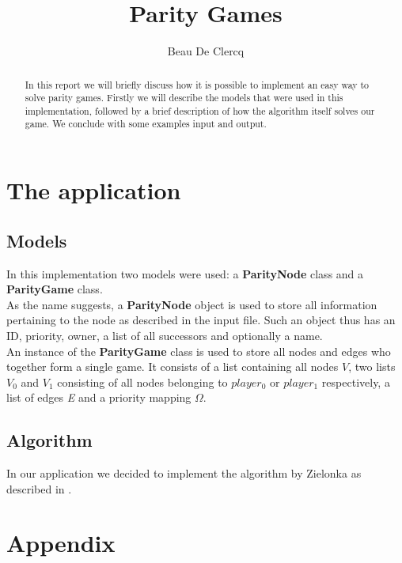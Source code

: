 \documentclass[12pt]{article}
\title{Parity Games}
\author{Beau De Clercq}
\begin{document}
\maketitle{}


\clearpage
\newpage

\begin{abstract}
	In this report we will briefly discuss how it is possible to implement an easy way to solve parity games. Firstly we will describe the models that were used in this implementation, followed by a brief description of how the algorithm itself solves our game. We conclude with some examples input and output.
\end{abstract}

\section{The application}
\subsection{Models}
In this implementation two models were used: a \textbf{ParityNode} class and a \textbf{ParityGame} class. \\
As the name suggests, a \textbf{ParityNode} object is used to store all information pertaining to the node as described in the input file. Such an object thus has an ID, priority, owner, a list of all successors and optionally a name.\\ 
An instance of the \textbf{ParityGame} class is used to store all nodes and edges who together form a single game. It consists of a list containing all nodes \textit{$V$}, two lists \textit{$V_0$} and \textit{$V_1$} consisting of all nodes belonging to $player_0$ or $player_1$ respectively, a list of edges \textit{E} and a priority mapping $\Omega$.\\

\subsection{Algorithm}
In our application we decided to implement the algorithm by Zielonka as described in \cite[~p28]{zielonka}.

\section{Appendix}
\end{document}
